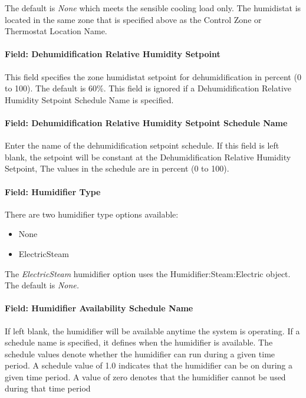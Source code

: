 The default is \emph{None} which meets the sensible cooling load only. The humidistat is located in the same zone that is specified above as the Control Zone or Thermostat Location Name.

\paragraph{Field: Dehumidification Relative Humidity Setpoint}\label{field-dehumidification-relative-humidity-setpoint}

This field specifies the zone humidistat setpoint for dehumidification in percent (0 to 100). The default is 60\%. This field is ignored if a Dehumidification Relative Humidity Setpoint Schedule Name is specified.

\paragraph{Field: Dehumidification Relative Humidity Setpoint Schedule Name}\label{field-dehumidification-relative-humidity-setpoint-schedule-name}

Enter the name of the dehumidification setpoint schedule. If this field is left blank, the setpoint will be constant at the Dehumidification Relative Humidity Setpoint, The values in the schedule are in percent (0 to 100).

\paragraph{Field: Humidifier Type}\label{field-humidifier-type-2}

There are two humidifier type options available:

\begin{itemize}
\item
  None
\item
  ElectricSteam
\end{itemize}

The \emph{ElectricSteam} humidifier option uses the Humidifier:Steam:Electric object. The default is \emph{None.}

\paragraph{Field: Humidifier Availability Schedule Name}\label{field-humidifier-availability-schedule-name-2}

If left blank, the humidifier will be available anytime the system is operating. If a schedule name is specified, it defines when the humidifier is available. The schedule values denote whether the humidifier can run during a given time period. A schedule value of 1.0 indicates that the humidifier can be on during a given time period. A value of zero denotes that the humidifier cannot be used during that time period

